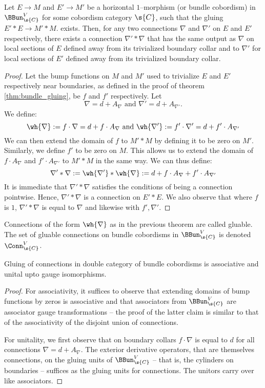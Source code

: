 \documentclass[\PRJWD/Thick_TQFTs_and_Quantum_Information.tex]{subfiles}
\begin{document}
\begin{thm}
Let $E \to M$ and $E' \to M'$ be a horizontal $1$--morphism
(or bundle cobordism) in $\BBun^V_{\s{C}}$ for some cobordism category $\s{C}$,
such that the gluing $E' * E \to M' * M$. exists. Then, for any two connections
$\nabla$ and $\nabla'$ on $E$ and $E'$ respectively, there exists a connection
$\nabla' * \nabla$ that has the same output as $\nabla$ on local sections of $E$
defined away from its trivialized boundary collar and to $\nabla'$ for local
sections of $E'$ defined away from its trivialized boundary collar.
\end{thm}
\begin{proof}
Let the bump functions on $M$ and $M'$ used to trivialize $E$ and $E'$
respectively near boundaries, as defined in the proof of theorem
\ref{thm:bundle_gluing}, be $f$ and $f'$ respectively. Let
\[
  \nabla = d + A_{\nabla} \text{ and } \nabla' = d + A_{\nabla'}.
\]
We define:
\[
  \wh{\nabla} := f \cdot \nabla = d + f \cdot A_{\nabla}
  \text{ and } \wh{\nabla'} := f' \cdot \nabla' = d + f' \cdot A_{\nabla'}
\]
We can then extend the domain of $f$ to $M' * M$ by defining it to be zero on
$M'$. Similarly, we define $f'$ to be zero on $M$. This allows us to extend the
domain of $f \cdot A_{\nabla}$ and $f' \cdot A_{\nabla'}$ to $M' * M$ in the
same way. We can thus define:
\[
  \nabla' * \nabla := \wh{\nabla'} * \wh{\nabla}
    := d + f \cdot A_{\nabla} + f' \cdot A_{\nabla'}
\]
It is immediate that $\nabla' * \nabla$ satisfies the conditions of being a
connection pointwise. Hence, $\nabla' * \nabla$ is a connection on $E' * E$. We
also observe that where $f$ is $1$, $\nabla' * \nabla$ is equal to $\nabla$ and
likewise with $f', \nabla'$.
\end{proof}

\begin{defn}
Connections of the form $\wh{\nabla}$ as in the previous theorem are called
gluable. The set of gluable connections on bundle cobordisms in
$\BBun^V_{\s{C}}$ is denoted $\Conn^V_{\s{C}}$.
\end{defn}

\begin{cor}
Gluing of connections in double category of bundle cobordisms is associative and
unital upto gauge isomorphisms.
\end{cor}
\begin{proof}
For associativity, it suffices to observe that extending domains of bump
functions by zeros is associative and that associators from $\BBun^V_{\s{C}}$
are associator gauge transformations -- the proof of the latter claim is similar
to that of the associativity of the disjoint union of connections.

For unitality, we first observe that on boundary collars $f \cdot \nabla$ is
equal to $d$ for all connections $\nabla = d + A_{\nabla}$. The exterior
derivative operators, that are themselves connections, on the gluing
units of $\BBun^V_{\s{C}}$ -- that is, the cylinders on boundaries -- suffices
as the gluing units for connections. The unitors carry over like associators.
\end{proof}
\end{document}

